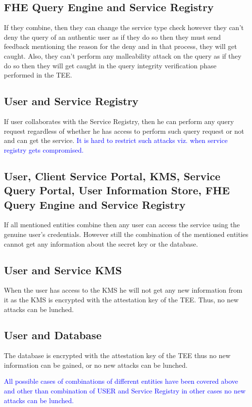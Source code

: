 \subsection{FHE Query Engine and Service Registry} If they combine, then they can change the service type check however they can’t deny the query of an authentic user as if they do so then they must send feedback mentioning the reason for the deny and in that process, they will get caught. Also, they can’t perform any malleability attack on the query as if they do so then they will get caught in the query integrity verification phase performed in the TEE.

\subsection{User and Service Registry} If user collaborates with the Service Registry, then he can perform any query request regardless of whether he has access to perform such query request or not and can get the service. \textcolor{blue} {It is hard to restrict such attacks viz. when service registry gets compromised.}

\subsection{User, Client Service Portal, KMS, Service Query Portal, User Information Store, FHE Query Engine and Service Registry} If all mentioned entities combine then any user can access the service using the genuine user’s credentials. However still the combination of the mentioned entities cannot get any information about the secret key or the database.

\subsection{User and Service KMS} When the user has access to the KMS he will not get any new information from it as the KMS is encrypted with the attestation key of the TEE. Thus, no new attacks can be lunched.

\subsection{User and Database} The database is encrypted with the attestation key of the TEE thus no new information can be gained, or no new attacks can be lunched.

\textcolor{blue} {All possible cases of combinations of different entities have been covered above and other than combination of USER and Service Registry in other cases no new attacks can be lunched.}

